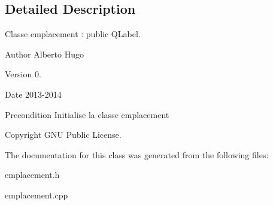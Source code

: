 \subsection{Detailed Description}
Classe emplacement \-: public Q\-Label. 

\begin{DoxyAuthor}{Author}
Alberto Hugo 
\end{DoxyAuthor}
\begin{DoxyVersion}{Version}
0. 
\end{DoxyVersion}
\begin{DoxyDate}{Date}
2013-\/2014 
\end{DoxyDate}
\begin{DoxyPrecond}{Precondition}
Initialise la classe emplacement 
\end{DoxyPrecond}
\begin{DoxyCopyright}{Copyright}
G\-N\-U Public License. 
\end{DoxyCopyright}


The documentation for this class was generated from the following files\-:\begin{DoxyCompactItemize}
\item 
emplacement.\-h\item 
emplacement.\-cpp\end{DoxyCompactItemize}
